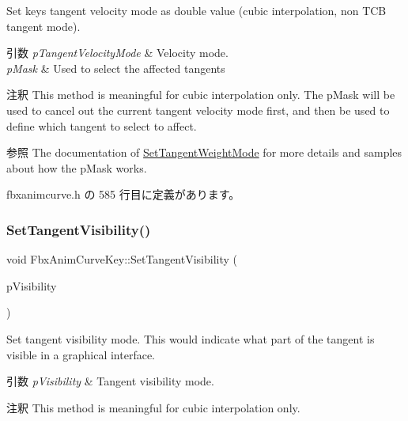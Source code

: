 Set key\textquotesingle{}s tangent velocity mode as double value (cubic interpolation, non T\+CB tangent mode). 
\begin{DoxyParams}{引数}
{\em p\+Tangent\+Velocity\+Mode} & Velocity mode. \\
\hline
{\em p\+Mask} & Used to select the affected tangents \\
\hline
\end{DoxyParams}
\begin{DoxyRemark}{注釈}
This method is meaningful for cubic interpolation only. The p\+Mask will be used to cancel out the current tangent velocity mode first, and then be used to define which tangent to select to affect.
\end{DoxyRemark}
\begin{DoxySeeAlso}{参照}
The documentation of \hyperlink{class_fbx_anim_curve_key_a418159da0643ccdbeb5aa59b69b821e0}{Set\+Tangent\+Weight\+Mode} for more details and samples about how the p\+Mask works. 
\end{DoxySeeAlso}


 fbxanimcurve.\+h の 585 行目に定義があります。

\mbox{\label{class_fbx_anim_curve_key_af38b131031d26da6038b89c17498f05f}} 
\subsubsection{\texorpdfstring{Set\+Tangent\+Visibility()}{SetTangentVisibility()}}
{\footnotesize\ttfamily void Fbx\+Anim\+Curve\+Key\+::\+Set\+Tangent\+Visibility (\begin{DoxyParamCaption}\item[{\hyperlink{class_fbx_anim_curve_def_a70c49072776ac6b3426c57dd80e16e3b}{Fbx\+Anim\+Curve\+Def\+::\+E\+Tangent\+Visibility}}]{p\+Visibility }\end{DoxyParamCaption})\hspace{0.3cm}{\ttfamily [inline]}}

Set tangent visibility mode. This would indicate what part of the tangent is visible in a graphical interface. 
\begin{DoxyParams}{引数}
{\em p\+Visibility} & Tangent visibility mode. \\
\hline
\end{DoxyParams}
\begin{DoxyRemark}{注釈}
This method is meaningful for cubic interpolation only. 
\end{DoxyRemark}


